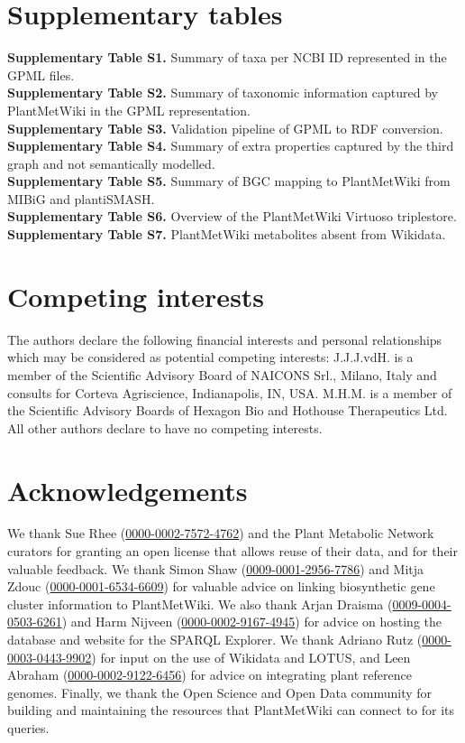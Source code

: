 \documentclass[11pt,a4paper]{article}
\begin{document}
\section*{Supplementary tables}

\textbf{Supplementary Table S1.} Summary of taxa per NCBI ID represented in the GPML files.\\
\textbf{Supplementary Table S2.} Summary of taxonomic information captured by PlantMetWiki in the GPML representation.\\
\textbf{Supplementary Table S3.} Validation pipeline of GPML to RDF conversion.\\
\textbf{Supplementary Table S4.} Summary of extra properties captured by the third graph and not semantically modelled.\\
\textbf{Supplementary Table S5.} Summary of BGC mapping to PlantMetWiki from MIBiG and plantiSMASH.\\
\textbf{Supplementary Table S6.} Overview of the PlantMetWiki Virtuoso triplestore.\\
\textbf{Supplementary Table S7.} PlantMetWiki metabolites absent from Wikidata.

\section*{Competing interests}

The authors declare the following financial interests and personal relationships which may be
considered as potential competing interests: J.J.J.vdH. is a member of the Scientific Advisory Board
of NAICONS Srl., Milano, Italy and consults for Corteva Agriscience, Indianapolis, IN, USA. M.H.M. is
a member of the Scientific Advisory Boards of Hexagon Bio and Hothouse Therapeutics Ltd. All other
authors declare to have no competing interests.

\section*{Acknowledgements}

We thank Sue Rhee (\href{https://orcid.org/0000-0002-7572-4762}{0000-0002-7572-4762}) and the Plant
Metabolic Network curators for granting an open license that allows reuse of their data, and for
their valuable feedback. We thank Simon Shaw
(\href{https://orcid.org/0009-0001-2956-7786}{0009-0001-2956-7786}) and Mitja Zdouc
(\href{https://orcid.org/0000-0001-6534-6609}{0000-0001-6534-6609}) for valuable advice on linking
biosynthetic gene cluster information to PlantMetWiki. We also thank Arjan Draisma
(\href{https://orcid.org/0009-0004-0503-6261}{0009-0004-0503-6261}) and Harm Nijveen
(\href{https://orcid.org/0000-0002-9167-4945}{0000-0002-9167-4945}) for advice on hosting the
database and website for the SPARQL Explorer. We thank Adriano Rutz
(\href{https://orcid.org/0000-0003-0443-9902}{0000-0003-0443-9902}) for input on the use of Wikidata
and LOTUS, and Leen Abraham (\href{https://orcid.org/0000-0002-9122-6456}{0000-0002-9122-6456}) for
advice on integrating plant reference genomes. Finally, we thank the Open Science and Open Data
community for building and maintaining the resources that PlantMetWiki can connect to for its
queries.
\end{document}
